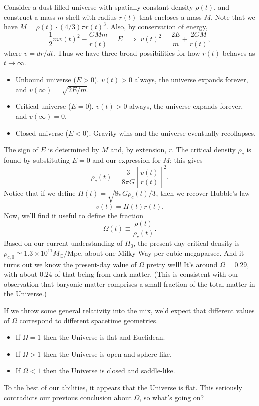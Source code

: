 \documentclass[../a062main.tex]{subfiles}
\begin{document}
Consider a dust-filled universe with spatially constant density $\rho(t)$, and construct a mass-$m$ shell with radius $r(t)$ that encloses a mass $M$.
Note that we have $M = \rho(t) \cdot (4 / 3)\pi r(t)^3$.
Also, by conservation of energy,
\[ \frac{1}{2}mv(t)^2 - \frac{GMm}{r(t)} = E \;\implies\; v(t)^2 = \frac{2E}{m} + \frac{2GM}{r(t)}, \]
where $v = dr / dt$.
Thus we have three broad possibilities for how $r(t)$ behaves as $t \to \infty$.
\begin{itemize}
    \item Unbound universe ($E > 0$).
    $v(t) > 0$ always, the universe expands forever, and $v(\infty) = \sqrt{2E / m}$.
    
    \item Critical universe ($E = 0$).
    $v(t) > 0$ always, the universe expands forever, and $v(\infty) = 0$.

    \item Closed universe ($E < 0$).
    Gravity wins and the universe eventually recollapses.
\end{itemize}
The sign of $E$ is determined by $M$ and, by extension, $r$.
The critical density $\rho_c$ is found by substituting $E = 0$ and our expression for $M$; this gives
\[ \boxed{\rho_c(t) = \frac{3}{8\pi G} \left[ \frac{v(t)}{r(t)} \right]^2}. \]
Notice that if we define $H(t) = \sqrt{8\pi G \rho_c(t) / 3}$, then we recover Hubble's law
\[ v(t) = H(t) r(t). \]
Now, we'll find it useful to define the fraction
\[ \boxed{\Omega(t) \equiv \frac{\rho(t)}{\rho_c(t)}}. \] 
Based on our current understanding of $H_0$, the present-day critical density is $\rho_{c,0} \simeq 1.3 \times 10^{11} M_\odot / \textrm{Mpc}$, about one Milky Way per cubic megaparsec.
And it turns out we know the present-day value of $\Omega$ pretty well!
It's around $\Omega = 0.29$, with about $0.24$ of that being from dark matter.
(This is consistent with our observation that baryonic matter comprises a small fraction of the total matter in the Universe.)

If we throw some general relativity into the mix, we'd expect that different values of $\Omega$ correspond to different spacetime geometries.
\begin{itemize}
    \item If $\Omega = 1$ then the Universe is flat and Euclidean.
    \item If $\Omega > 1$ then the Universe is open and sphere-like.
    \item If $\Omega < 1$ then the Universe is closed and saddle-like.
\end{itemize}
To the best of our abilities, it appears that the Universe is flat.
This seriously contradicts our previous conclusion about $\Omega$, so what's going on?
\end{document}

